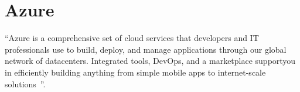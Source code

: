 \section{Azure}

``Azure is a comprehensive set of cloud services that developers
and IT professionals use to build, deploy, and manage applications through our
global network of datacenters. Integrated tools, DevOps, and a marketplace
supportyou in efficiently building anything from simple mobile apps to
internet-scale solutions~\cite{www-azure}''.
